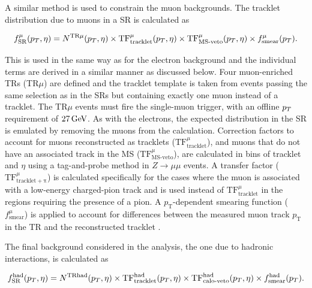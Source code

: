 A similar method is used to constrain the muon backgrounds. The tracklet \pt distribution due to muons in a SR is calculated as

\begin{equation*}
f_{\mathrm{SR}}^{\mu}(p_T,\eta) = N^{\mathrm{TR}\mu}(p_T,\eta) \times \mathrm{TF}^\mu_{\mathrm{tracklet}}(p_T,\eta) \times \mathrm{TF}^\mu_{\textrm{MS-veto}}(p_T,\eta)\times f^{\mu}_{\mathrm{smear}}(p_T).
\end{equation*}

This is used in the same way as for the electron background and the individual terms are derived in a similar manner as discussed below. Four muon-enriched TRs (TR$\mu$) are defined and the tracklet \pt template is taken from events passing the same selection as in the SRs but containing exactly one muon instead of a tracklet. The TR$\mu$ events must fire the single-muon trigger, with an offline $p_T$ requirement of $27\,\text{GeV}$. As with the electrons, the expected \met distribution in the SR is emulated by removing the muons from the \met calculation. Correction factors to account for muons reconstructed as tracklets ($\mathrm{TF}^\mu_{\mathrm{tracklet}}$), and muons that do not have an associated track in the MS ($\mathrm{TF}^{\mu}_{\textrm{MS-veto}}$), are calculated in bins of tracklet \pt and $\eta$ using a tag-and-probe method in $Z\rightarrow \mu\mu$ events. A transfer factor ($\mathrm{TF}^{\mu}_{\mathrm{tracklet+\pi}}$) is calculated specifically for the cases where the muon is associated with a low-energy charged-pion track and is used instead of $\mathrm{TF}^\mu_{\mathrm{tracklet}}$ in the regions requiring the presence of a pion. A $p_{\mathrm{T}}$-dependent smearing function ($f^{\mu}_{\mathrm{smear}}$) is applied to account for differences between the measured muon track $p_{\mathrm{T}}$ in the TR and the reconstructed tracklet \pt. 

The final background considered in the analysis, the one due to hadronic interactions, is calculated as

\begin{equation*}
f_{\mathrm{SR}}^{\mathrm{had}}(p_T,\eta) = N^{\mathrm{TRhad}}(p_T,\eta) \times \mathrm{TF}^{\mathrm{had}}_{\mathrm{tracklet}}(p_T,\eta) \times \mathrm{TF}^{\mathrm{had}}_{\textrm{calo-veto}}(p_T,\eta) \times f^{\mathrm{had}}_{\mathrm{smear}}(p_T).
\end{equation*}

